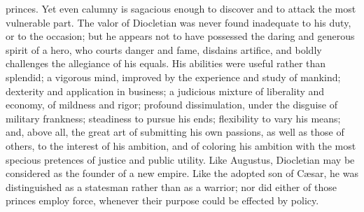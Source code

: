 princes. Yet even calumny is sagacious enough to discover and to
attack the most vulnerable part. The valor of Diocletian was
never found inadequate to his duty, or to the occasion; but he
appears not to have possessed the daring and generous spirit of a
hero, who courts danger and fame, disdains artifice, and boldly
challenges the allegiance of his equals. His abilities were
useful rather than splendid; a vigorous mind, improved by the
experience and study of mankind; dexterity and application in
business; a judicious mixture of liberality and economy, of
mildness and rigor; profound dissimulation, under the disguise of
military frankness; steadiness to pursue his ends; flexibility to
vary his means; and, above all, the great art of submitting his
own passions, as well as those of others, to the interest of his
ambition, and of coloring his ambition with the most specious
pretences of justice and public utility. Like Augustus,
Diocletian may be considered as the founder of a new empire. Like
the adopted son of Cæsar, he was distinguished as a statesman
rather than as a warrior; nor did either of those princes employ
force, whenever their purpose could be effected by policy.




